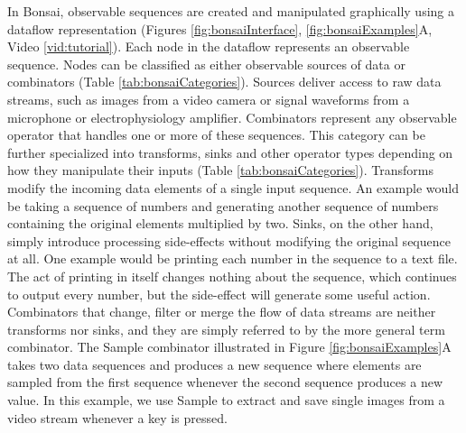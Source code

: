 In Bonsai, observable sequences are created and manipulated graphically using a dataflow \cite{Mosconi2000, Johnston2004} representation (Figures \ref{fig:bonsaiInterface}, \ref{fig:bonsaiExamples}A, Video \ref{vid:tutorial}). Each node in the dataflow represents an observable sequence. Nodes can be classified as either observable sources of data or combinators (Table \ref{tab:bonsaiCategories}). Sources deliver access to raw data streams, such as images from a video camera or signal waveforms from a microphone or electrophysiology amplifier. Combinators represent any observable operator that handles one or more of these sequences. This category can be further specialized into transforms, sinks and other operator types depending on how they manipulate their inputs (Table \ref{tab:bonsaiCategories}). Transforms modify the incoming data elements of a single input sequence. An example would be taking a sequence of numbers and generating another sequence of numbers containing the original elements multiplied by two. Sinks, on the other hand, simply introduce processing side-effects without modifying the original sequence at all. One example would be printing each number in the sequence to a text file. The act of printing in itself changes nothing about the sequence, which continues to output every number, but the side-effect will generate some useful action. Combinators that change, filter or merge the flow of data streams are neither transforms nor sinks, and they are simply referred to by the more general term combinator. The Sample combinator illustrated in Figure \ref{fig:bonsaiExamples}A takes two data sequences and produces a new sequence where elements are sampled from the first sequence whenever the second sequence produces a new value. In this example, we use Sample to extract and save single images from a video stream whenever a key is pressed.

